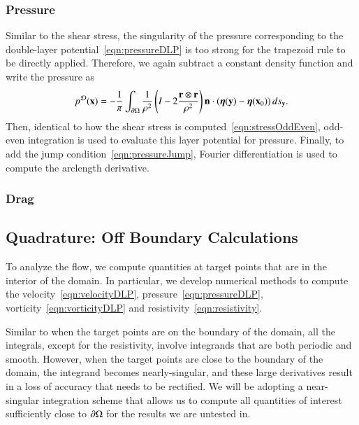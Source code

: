 \documentclass[preprint, 10pt]{elsarticle}
\begin{document}
\subsubsection{Pressure}
Similar to the shear stress, the singularity of the pressure
corresponding to the double-layer potential~\eqref{eqn:pressureDLP} is
too strong for the trapezoid rule to be directly applied.  Therefore, we
again subtract a constant density function and write the pressure as
\begin{align*}
  p^{\mathcal{D}}({\mathbf{x}}) = -\frac{1}{\pi}\int_{{\partial}\Omega} \frac{1}{\rho^2}
    \left(I - 2 \frac{{\mathbf{r}} \otimes {\mathbf{r}}}{\rho^2}\right) 
    {\mathbf{n}} \cdot ({\boldsymbol\eta}({\mathbf{y}}) - {\boldsymbol\eta}({\mathbf{x}}_0)) \,ds_{\mathbf{y}}.
\end{align*}
Then, identical to how the shear stress is
computed~\eqref{eqn:stressOddEven}, odd-even integration is used to
evaluate this layer potential for pressure.  Finally, to add the jump
condition~\eqref{eqn:pressureJump}, Fourier differentiation is used to
compute the arclength derivative. 


\subsubsection{Drag}



\subsection{Quadrature: Off Boundary Calculations} 
\label{sec:off_boundary}
To analyze the flow, we compute quantities at target points that are in
the interior of the domain.  In particular, we develop numerical methods
to compute the velocity~\eqref{eqn:velocityDLP},
pressure~\eqref{eqn:pressureDLP}, vorticity~\eqref{eqn:vorticityDLP} and
resistivity~\eqref{eqn:resistivity}.  

Similar to when the target points are on the boundary of the domain, all
the integrals, except for the resistivity, involve integrands that are
both periodic and smooth.  However, when the target points are close to
the boundary of the domain, the integrand becomes nearly-singular, and
these large derivatives result in a loss of accuracy that needs to be
rectified.  We will be adopting a near-singular integration scheme that
allows us to compute all quantities of interest sufficiently close to
${\partial}\Omega$ for the results we are untested in.
\end{document}

